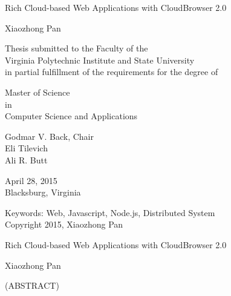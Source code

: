\documentclass[12pt]{report}
\begin{document}
\newcommand{\cb}{Cloud\-Browser\xspace}
\newcommand{\projectname}{Cloud\-Browser\xspace}
\newcommand{\cbtwo}{Cloud\-Browser 2.0\xspace}
\newcommand{\js}{Java\-Script\xspace}
\newcommand{\nodejs}{Node.js\xspace}
\newcommand{\appins}{App Instance\xspace}
\newcommand{\jsdom}{JSDOM\xspace}
\newcommand{\citemain}{~\cite{mcdaniel2012cloudbrowser}}
\newcommand{\etdtitle}{Rich Cloud-based Web Applications with \cbtwo}

\newcommand{\longcaption}[2]{\caption[#1]{#1 #2}}



\def\code#1{\texttt{#1}}
\def\nodermi{\texttt{nodermi\xspace}}

\thispagestyle{empty}
\begin{center}

{\Large 
\etdtitle{}
}

\vfill

Xiaozhong Pan

\vfill

Thesis submitted to the Faculty of the \\
Virginia Polytechnic Institute and State University \\
in partial fulfillment of the requirements for the degree of

\vfill

Master of Science \\
in \\
Computer Science and Applications

\vfill

Godmar V. Back, Chair \\
Eli Tilevich\\
Ali R. Butt

\vfill

April 28, 2015 \\
Blacksburg, Virginia

\vfill

Keywords: Web, Javascript, Node.js, Distributed System
\\
Copyright 2015, Xiaozhong Pan

\end{center}

\pagebreak

\thispagestyle{empty}
\begin{center}

{\large \etdtitle{}}

\vfill

Xiaozhong Pan

\vfill

(ABSTRACT)

\vfill

\end{center}
\end{document}

